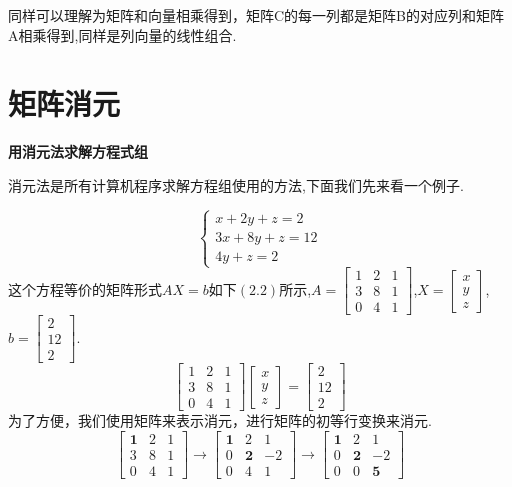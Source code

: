 \documentclass[oneside]{book}
\begin{document}
	同样可以理解为矩阵和向量相乘得到，矩阵C的每一列都是矩阵B的对应列和矩阵A相乘得到,同样是列向量的线性组合.
	\chapter{矩阵消元}
	\textbf{用消元法求解方程式组}
	
	消元法是所有计算机程序求解方程组使用的方法,下面我们先来看一个例子.
	
	\begin{equation}
		\left\{
		\begin{array}{c}
			x+2y+z=2\\
			3x+8y+z=12\\
			4y+z=2
		\end{array}
		\right.
	\end{equation}
	这个方程等价的矩阵形式$ AX=b $如下$ (2.2) $所示,$ A=\left[
	\begin{array}{ccc}
		1 & 2 & 1 \\
		3 & 8 & 1\\
		0 & 4 & 1
	\end{array}
	\right] $,$ X=\left[
	\begin{array}{c}
		x \\
		y\\
		z
	\end{array}
	\right] $,$ b= \left[
	\begin{array}{c}
		2 \\
		12\\
		2
	\end{array}
	\right]$.
	\begin{equation}
		\left[
		\begin{array}{ccc}
			1 & 2 & 1 \\
			3 & 8 & 1\\
			0 & 4 & 1
		\end{array}
		\right]
		\left[
		\begin{array}{c}
			x \\
			y\\
			z
		\end{array}
		\right]
		=
		\left[
		\begin{array}{c}
			2 \\
			12\\
			2
		\end{array}
		\right]
	\end{equation}
	为了方便，我们使用矩阵来表示消元，进行矩阵的初等行变换来消元.
	$$
	\left[
	\begin{array}{ccc}
		\textbf{1} & 2 & 1 \\
		3 & 8 & 1\\
		0 & 4 & 1
	\end{array}
	\right]
	\rightarrow
		\left[
	\begin{array}{ccc}
		\textbf{1} & 2 & 1 \\
		0 & \textbf{2} & -2\\
		0 & 4 & 1
	\end{array}
	\right]
	\rightarrow
		\left[
	\begin{array}{ccc}
		\textbf{1} & 2 & 1 \\
		0 & \textbf{2} & -2\\
		0 & 0 & \textbf{5}
	\end{array}
	\right]
	 $$
\end{document}
